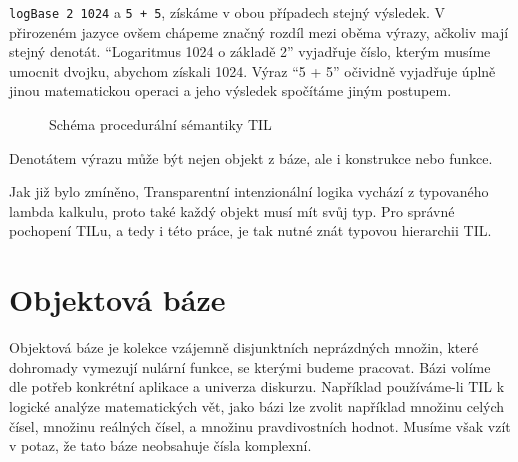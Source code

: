 \lstset{language=Haskell}
\lstinline{logBase 2 1024} a \lstinline{5 + 5}, získáme v obou případech stejný výsledek.
V přirozeném jazyce ovšem chápeme značný rozdíl mezi oběma výrazy, ačkoliv mají stejný denotát.
``Logaritmus 1024 o základě 2'' vyjadřuje číslo, kterým musíme umocnit dvojku, abychom získali 1024.
Výraz ``5 + 5'' očividně vyjadřuje úplně jinou matematickou operaci a jeho výsledek spočítáme jiným
postupem.

\begin{figure}
    \centering
    \caption{Schéma procedurální sémantiky TIL}\label{fig:til-semantics}
\end{figure}

Denotátem výrazu může být nejen objekt z báze, ale i konstrukce nebo funkce.

Jak již bylo zmíněno, Transparentní intenzionální logika vychází z typovaného lambda kalkulu, proto
také každý objekt musí mít svůj typ. Pro správné pochopení TILu, a tedy i této práce, je tak nutné 
znát typovou hierarchii TIL.

\section{Objektová báze}

Objektová báze je kolekce vzájemně disjunktních neprázdných množin, které dohromady vymezují
nulární funkce, se kterými budeme pracovat. Bázi volíme dle potřeb konkrétní aplikace a univerza
diskurzu. Například používáme-li TIL k logické analýze matematických vět, jako bázi lze zvolit
například množinu celých čísel, množinu reálných čísel, a množinu pravdivostních hodnot. Musíme
však vzít v potaz, že tato báze neobsahuje čísla komplexní.

